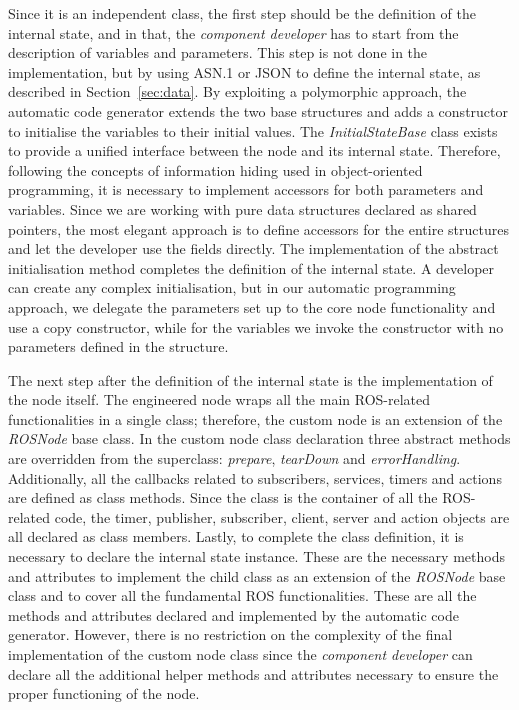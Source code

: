 Since it is an independent class, the first step should be the definition of the internal state, and in that, the \textit{component developer} has to start from the description of variables and parameters. This step is not done in the implementation, but by using ASN.1 or JSON to define the internal state, as described in Section~\ref{sec:data}. By exploiting a polymorphic approach, the automatic code generator extends the two base structures and adds a constructor to initialise the variables to their initial values. The \textit{InitialStateBase} class exists to provide a unified interface between the node and its internal state. Therefore, following the concepts of information hiding used in object-oriented programming, it is necessary to implement accessors for both parameters and variables. Since we are working with pure data structures declared as shared pointers, the most elegant approach is to define accessors for the entire structures and let the developer use the fields directly. The implementation of the abstract initialisation method completes the definition of the internal state. A developer can create any complex initialisation, but in our automatic programming approach, we delegate the parameters set up to the core node functionality and use a copy constructor, while for the variables we invoke the constructor with no parameters defined in the structure.

The next step after the definition of the internal state is the implementation of the node itself. The engineered node wraps all the main ROS-related functionalities in a single class; therefore, the custom node is an extension of the \textit{ROSNode} base class. In the custom node class declaration three abstract methods are overridden from the superclass: \textit{prepare}, \textit{tearDown} and \textit{errorHandling}. Additionally, all the callbacks related to subscribers, services, timers and actions are defined as class methods. Since the class is the container of all the ROS-related code, the timer, publisher, subscriber, client, server and action objects are all declared as class members. Lastly, to complete the class definition, it is necessary to declare the internal state instance. These are the necessary methods and attributes to implement the child class as an extension of the \textit{ROSNode} base class and to cover all the fundamental ROS functionalities. These are all the methods and attributes declared and implemented by the automatic code generator. However, there is no restriction on the complexity of the final implementation of the custom node class since the \textit{component developer} can declare all the additional helper methods and attributes necessary to ensure the proper functioning of the node.

